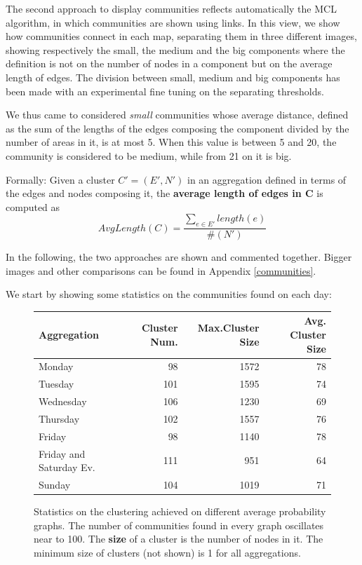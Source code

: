 \documentclass[12pt,a4paper]{article}
\begin{document}
The second approach to display communities reflects automatically the MCL algorithm, in which communities are shown using links. In this view, we show how communities connect in each map, separating them in three different images, showing
respectively the small, the medium and the big components where the definition
is not on the number of nodes in a component but on the average length of edges. The division between small, medium and big components has been made with an experimental fine tuning on the separating thresholds.


We thus came to considered \emph{small} communities whose average distance, defined as the sum of the lengths of the edges composing the component divided by the number of areas in it, is at most 5. When this value is between 5 and 20, the community is considered to be medium, while from 21 on it is big.

Formally: Given a cluster $C' = (E', N')$ in an aggregation defined in terms of the
edges and nodes composing it, the \textbf{average length of edges in C} is computed as
$$AvgLength(C) = \frac{\sum_{e \in E'} length(e)}{\#(N')} $$

In the following, the two approaches are shown and commented together. Bigger images and other comparisons can be found in Appendix \ref{communities}. 

We start by showing some statistics on the communities found on each day:

\begin{figure}[H]
\centering
\begin{tabular}{| l | r | r | r |}
\hline
\textbf{Aggregation} & \textbf{Cluster Num.} & \textbf{Max.Cluster Size} & \textbf{Avg. Cluster Size} \\ \hline
Monday & 98 & 1572 & 78 \\ \hline
Tuesday & 101 & 1595 & 74 \\ \hline
Wednesday & 106 & 1230  & 69 \\ \hline
Thursday & 102 & 1557  & 76 \\ \hline
Friday &  98 & 1140 & 78 \\ \hline
Friday and Saturday Ev. & 111 & 951 & 64 \\ \hline
Sunday & 104 & 1019 & 71 \\ \hline
\end{tabular}
\caption{Statistics on the clustering achieved on different average probability graphs. 
The number of communities found
in every graph oscillates near to 100. 
The \textbf{size} of a cluster is the number of nodes in it.
The minimum size of clusters (not shown) is 1 for all aggregations.}
\label{fig:foundClusters}
\end{figure}
\end{document}
